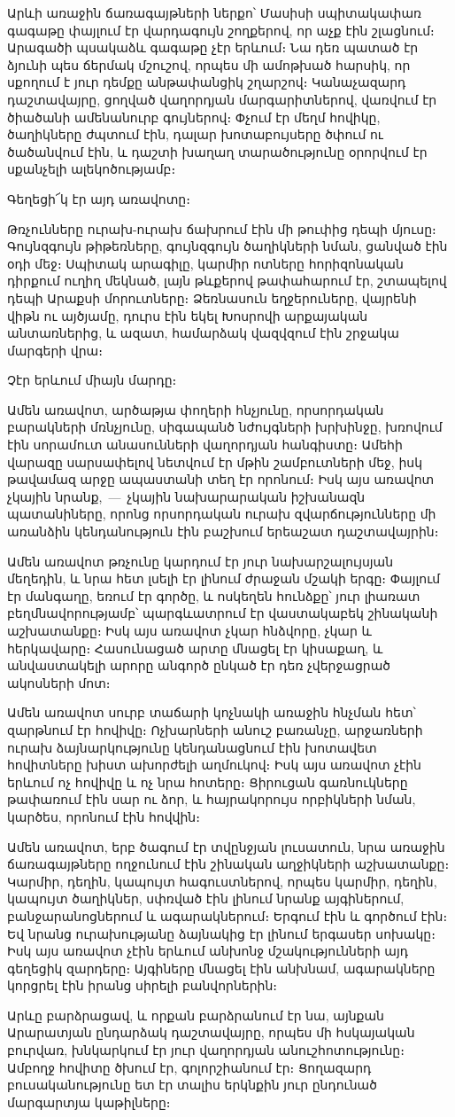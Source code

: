 Արևի առաջին ճառագայթների ներքո՝ Մասիսի սպիտակափառ գագաթը փայլում էր վարդագույն
շողքերով, որ աչք էին շլացնում։ Արագածի պսակաձև գագաթը չէր երևում։ Նա դեռ պատած
էր ձյունի պես ճերմակ մշուշով, որպես մի ամոթխած հարսիկ, որ սքողում է յուր դեմքը
անթափանցիկ շղարշով։ Կանաչազարդ դաշտավայրը, ցողված վաղորդյան մարգարիտներով,
վառվում էր ծիածանի ամենանուրբ գույներով։ Փչում էր մեղմ հովիկը, ծաղիկները
ժպտում էին, դալար խոտաբույսերը ծփում ու ծածանվում էին, և դաշտի խաղաղ
տարածությունը օրորվում էր սքանչելի ալեկոծությամբ։

Գեղեցի՜կ էր այդ առավոտը։

Թռչունները ուրախ-ուրախ ճախրում էին մի թուփից դեպի մյուսը։ Գույնզգույն
թի\-թեռ\-ները, գույնզգույն ծաղիկների նման, ցանված էին օդի մեջ։ Սպիտակ արագիլը,
կարմիր ոտները հորիզոնական դիրքում ուղիղ մեկնած, լայն թևքերով թափահարում էր,
շտապելով դեպի Արաքսի մորուտները։ Ձեռնասուն եղջերուները, վայրենի վիթն ու
այծյամը, դուրս էին եկել Խոսրովի արքայական անտառներից, և ազատ, համարձակ
վազվզում էին շրջակա մարգերի վրա։

Չէր երևում միայն մարդը։

Ամեն առավոտ, արծաթյա փողերի հնչյունը, որսորդական բարակների մռնչյունը,
սի\-գա\-պանծ նժույգների խրխինջը, խռովում էին սորամուտ անասունների վաղորդյան
հանգիստը։ Ամեհի վարազը սարսափելով նետվում էր մթին շամբուտների մեջ, իսկ թավամազ
արջը ապաստանի տեղ էր որոնում։ Իսկ այս առավոտ չկային նրանք,~—~չկային
նախարարական իշխանազն պատանիները, որոնց որսորդական ուրախ զվարճությունները մի
առանձին կեն\-դա\-նու\-թյուն էին բաշխում երեաշատ դաշտավայրին։

Ամեն առավոտ թռչունը կարդում էր յուր նախարշալույսյան մեղեդին, և նրա հետ լսելի
էր լինում ժրաջան մշակի երգը։ Փայլում էր մանգաղը, եռում էր գործը, և ոսկեղեն
հունձքը՝ յուր լիառատ բեղմնավորությամբ՝ պարգևատրում էր վաստակաբեկ շինականի
աշխատանքը։ Իսկ այս առավոտ չկար հնձվորը, չկար և հերկավարը։ Հասունացած արտը
մնացել էր կիսաքաղ, և անվաստակելի արորը անգործ ընկած էր դեռ չվերջացրած ակոսների
մոտ։

Ամեն առավոտ սուրբ տաճարի կոչնակի առաջին հնչման հետ՝ զարթնում էր հովիվը։
Ոչխարների անուշ բառանչը, արջառների ուրախ ձայնարկությունը կենդանացնում էին
խո\-տա\-վետ հովիտները խիստ ախորժելի աղմուկով։ Իսկ այս առավոտ չէին երևում ոչ
հովիվը և ոչ նրա հոտերը։ Ցիրուցան գառնուկները թափառում էին սար ու ձոր, և
հայրակորույս որբիկների նման, կարծես, որոնում էին հովվին։

Ամեն առավոտ, երբ ծագում էր տվընջյան լուսատուն, նրա առաջին ճառագայթները
ողջունում էին շինական աղջիկների աշխատանքը։ Կարմիր, դեղին, կապույտ
հագուստներով, որպես կարմիր, դեղին, կապույտ ծաղիկներ, սփռված էին լինում նրանք
այգիներում, բան\-ջա\-րա\-նոց\-նե\-րում և ագարակներում։ Երգում էին և գործում
էին։ Եվ նրանց ուրախությանը ձայնակից էր լինում երգասեր սոխակը։ Իսկ այս առավոտ
չէին երևում անխոնջ մշա\-կու\-թյուն\-նե\-րի այդ գեղեցիկ զարդերը։ Այգիները
մնացել էին անխնամ, ագարակները կորցրել էին իրանց սիրելի բանվորներին։

Արևը բարձրացավ, և որքան բարձրանում էր նա, այնքան Արարատյան ընդարձակ
դաշ\-տա\-վայրը, որպես մի հսկայական բուրվառ, խնկարկում էր յուր վաղորդյան
անուշհոտությունը։ Ամբողջ հովիտը ծխում էր, գոլորշիանում էր։ Ցողազարդ
բուսականությունը ետ էր տալիս երկնքին յուր ընդունած մարգարտյա կաթիլները։

\bye

